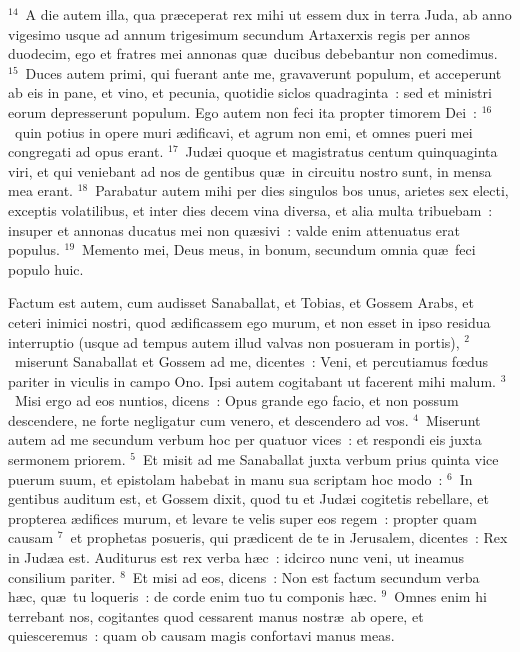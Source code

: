 ${}^{14}$~A die autem illa, qua pr\ae ceperat rex mihi ut essem dux in terra Juda, ab anno vigesimo usque ad annum trigesimum secundum Artaxerxis regis per annos duodecim, ego et fratres mei annonas qu\ae\ ducibus debebantur non comedimus.
${}^{15}$~Duces autem primi, qui fuerant ante me, gravaverunt populum, et acceperunt ab eis in pane, et vino, et pecunia, quotidie siclos quadraginta~: sed et ministri eorum depresserunt populum. Ego autem non feci ita propter timorem Dei~:
${}^{16}$~quin potius in opere muri \ae dificavi, et agrum non emi, et omnes pueri mei congregati ad opus erant.
${}^{17}$~Jud\ae i quoque et magistratus centum quinquaginta viri, et qui veniebant ad nos de gentibus qu\ae\ in circuitu nostro sunt, in mensa mea erant.
${}^{18}$~Parabatur autem mihi per dies singulos bos unus, arietes sex electi, exceptis volatilibus, et inter dies decem vina diversa, et alia multa tribuebam~: insuper et annonas ducatus mei non qu\ae sivi~: valde enim attenuatus erat populus.
${}^{19}$~Memento mei, Deus meus, in bonum, secundum omnia qu\ae\ feci populo huic.

\lettrine[lines=10,image=true,loversize=0.05,lraise=-0.03]{F}{}actum est autem, cum audisset Sanaballat, et Tobias, et Gossem Arabs, et ceteri inimici nostri, quod \ae dificassem ego murum, et non esset in ipso residua interruptio (usque ad tempus autem illud valvas non posueram in portis),
${}^{2}$~miserunt Sanaballat et Gossem ad me, dicentes~: Veni, et percutiamus fœdus pariter in viculis in campo Ono. Ipsi autem cogitabant ut facerent mihi malum.
${}^{3}$~Misi ergo ad eos nuntios, dicens~: Opus grande ego facio, et non possum descendere, ne forte negligatur cum venero, et descendero ad vos.
${}^{4}$~Miserunt autem ad me secundum verbum hoc per quatuor vices~: et respondi eis juxta sermonem priorem.
${}^{5}$~Et misit ad me Sanaballat juxta verbum prius quinta vice puerum suum, et epistolam habebat in manu sua scriptam hoc modo~:
${}^{6}$~In gentibus auditum est, et Gossem dixit, quod tu et Jud\ae i cogitetis rebellare, et propterea \ae difices murum, et levare te velis super eos regem~: propter quam causam
${}^{7}$~et prophetas posueris, qui pr\ae dicent de te in Jerusalem, dicentes~: Rex in Jud\ae a est. Auditurus est rex verba h\ae c~: idcirco nunc veni, ut ineamus consilium pariter.
${}^{8}$~Et misi ad eos, dicens~: Non est factum secundum verba h\ae c, qu\ae\ tu loqueris~: de corde enim tuo tu componis h\ae c.
${}^{9}$~Omnes enim hi terrebant nos, cogitantes quod cessarent manus nostr\ae\ ab opere, et quiesceremus~: quam ob causam magis confortavi manus meas.


